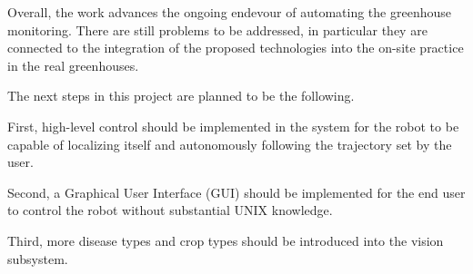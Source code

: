 Overall, the work advances the ongoing endevour of automating the greenhouse monitoring.
There are still problems to be addressed, in particular they are connected to the integration of the proposed technologies into the on-site practice in the real greenhouses.

The next steps in this project are planned to be the following.


First, high-level control should be implemented in the system for the robot to be capable of localizing itself and autonomously following the trajectory set by the user.

Second, a Graphical User Interface (GUI) should be implemented for the end user to control the robot without substantial UNIX knowledge.

Third, more disease types and crop types should be introduced into the vision subsystem.